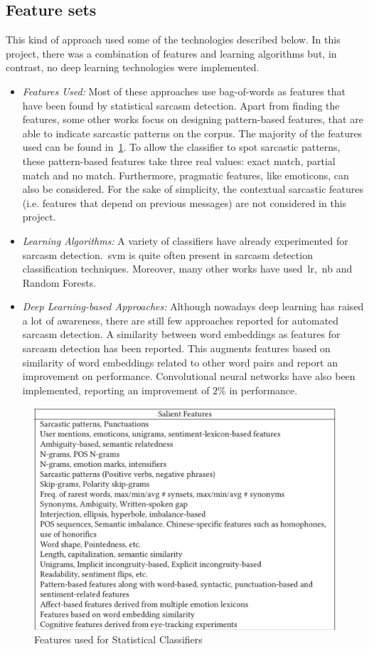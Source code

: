\subsection{Feature sets \cite{joshi2017automatic}}
This kind of approach used some of the technologies described below. In this project, there was a combination of features and learning algorithms but, in contrast, no deep learning technologies were implemented.
\begin{itemize}
	\item \textit{Features Used:} Most of these approaches use bag-of-words as features that have been found by statistical sarcasm detection. Apart from finding the features, some other works focus on designing pattern-based features, that are able to indicate sarcastic patterns on the corpus. The majority of the features used can be found in~\cref{fig:featused}. To allow the classifier to spot sarcastic patterns, these pattern-based features take three real values: exact match, partial match and no match. Furthermore, pragmatic features, like emoticons, can also be considered. For the sake of simplicity, the contextual sarcastic features (i.e. features that depend on previous messages) are not considered in this project.
	\item \textit{Learning Algorithms:} A variety of classifiers have already experimented for sarcasm detection.~\acf{svm} is quite often present in sarcasm detection classification techniques. Moreover, many other works have used~\acf{lr},~\acf{nb} and Random Forests.
	\item \textit{Deep Learning-based Approaches:} Although nowadays deep learning has raised a lot of awareness, there are still few approaches reported for automated sarcasm detection. A similarity between word embeddings as features for sarcasm detection has been reported. This augments features based on similarity of word embeddings related to other word pairs and report an improvement on performance. Convolutional neural networks have also been implemented, reporting an improvement of $2\%$ in performance.
\end{itemize}
\begin{figure}
	\centering
	\includegraphics[scale=0.25]{img/features.jpeg}
	\caption{Features used for Statistical Classifiers~\cite{joshi2017automatic}}
	\label{fig:featused}
\end{figure}
